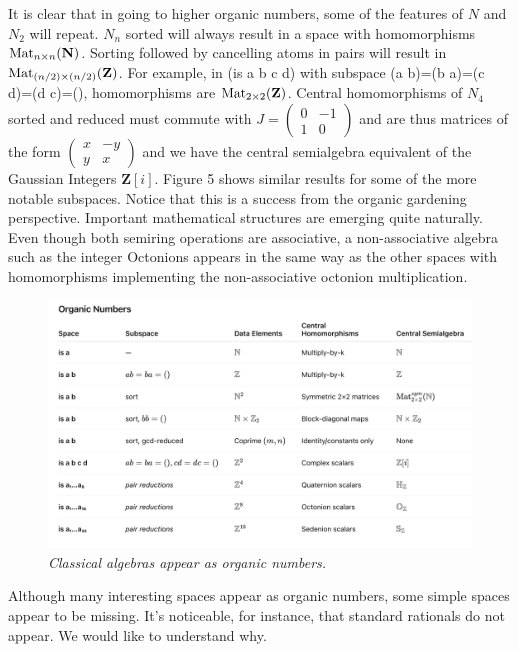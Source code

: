\documentclass[11pt]{article}
\begin{document}
     It is clear that in going to higher organic numbers, some of the features of $N$ and $N_2$ will repeat.  $N_n$ sorted 
 will always result in a space with homomorphisms ${\rm Mat}_{n\times n}(\mathbf N)$.  Sorting followed by cancelling 
 atoms in pairs will result in ${\rm Mat}_{(n/2)\times (n/2)}(\mathbf Z)$.  For example, in (is a b c d) with subspace 
 (a b)=(b a)=(c d)=(d c)=(), homomorphisms are ${\rm Mat}_{2\times 2}(\mathbf Z)$.  Central homomorphisms of $N_4$ sorted and reduced 
 must commute with 
 $
J=
\left (
\begin{array}{cc} 
0 & -1 \\ 1 & 0 
\end{array}
\right ) 
$
and are thus matrices of the form 
$
\left (
\begin{array}{cc} 
x & -y \\ y & x 
\end{array}
\right ) 
$
and we have the central semialgebra equivalent of the Gaussian Integers ${\mathbf Z}[i]$.  
Figure 5 shows similar results for some of the more notable subspaces.  
Notice that this is a success from the organic gardening perspective.  Important mathematical 
structures are emerging quite naturally.  Even though both semiring operations 
are associative, a non-associative algebra such as the integer Octonions appears in the 
same way as the other spaces with homomorphisms implementing the non-associative octonion 
multiplication\cite{octonions}.  
 
\begin{figure}[h]
\centering
\includegraphics[width=1.1\textwidth]{OrganicTable.png}
\caption{{\it Classical algebras appear as organic numbers.}}
\end{figure}
\noindent Although many interesting spaces appear as organic numbers, some simple spaces appear to be missing.  It's noticeable, 
for instance, that standard rationals do not appear.  We would like to understand why.  
\end{document}
